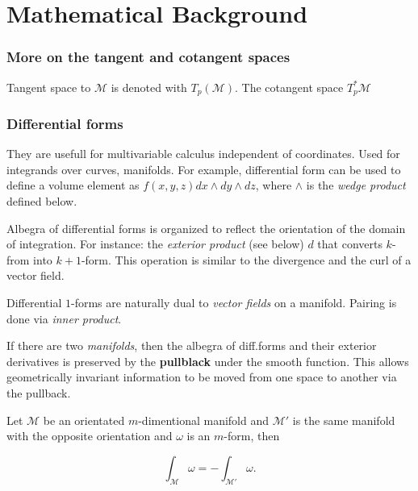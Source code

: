
\chapter{Mathematical Background}
\label{app:math_back}


\subsection{More on the tangent and cotangent spaces}

Tangent space to $\mathcal{M}$ is denoted with $T_p(\mathcal{M})$.
The cotangent space $T_p ^* \mathcal{M}$


\subsection{Differential forms}

They are usefull for multivariable calculus independent of coordinates. Used for integrands over curves, manifolds. For example, differential form can be used to define a volume element as $f(x,y,z)dx \wedge dy \wedge dz$, where $\wedge$ is the \textit{wedge product} defined below.

Albegra of differential forms is organized to reflect the orientation of the domain of integration. For instance: the \textit{exterior product} (see below) $d$ that converts $k$-from into $k+1$-form. 
This operation is similar to the divergence and the curl of a vector field.

Differential $1$-forms are naturally dual to \textit{vector fields} on a manifold. Pairing is done via \textit{inner product}.

If there are two \textit{manifolds}, then the albegra of diff.forms and their exterior derivatives is preserved by the \textbf{pullblack} under the smooth function. 
This allows geometrically invariant information to be moved from one space to another via the pullback.

Let $\mathcal{M}$ be an orientated $m$-dimentional manifold and $\mathcal{M}'$ is the same manifold with the opposite orientation and $\omega$ is an $m$-form, then 

\begin{equation}
\int_{\mathcal{M}}\omega = -\int_{\mathcal{M}'}\omega.
\end{equation}

